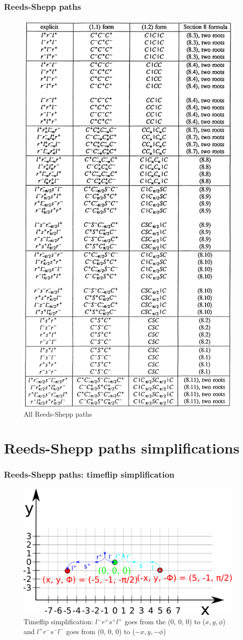 \documentclass{beamer}
\begin{document}
\begin{frame}

\frametitle{Reeds-Shepp paths}

\begin{figure}
\centering
  \centering
  \includegraphics[width=0.4\linewidth]{Illustrations/ReedsSheppPossibilitiesNoTitle.png}
  \caption{All Reeds-Shepp paths}
  \label{fig:sub1}
\end{figure}
\end{frame}

\section{Reeds-Shepp paths simplifications}

\begin{frame}

\frametitle{Reeds-Shepp paths: timeflip simplification}

\begin{figure}
\centering
  \centering
  \includegraphics[width=\linewidth]{Illustrations/timeflip.png}
  \caption{Timeflip simplification: $l^-r^+s^+l^+$ goes from the (0, 0, 0) to ($x, y, \phi$) and $l^+r^-s^-l^-$ goes from (0, 0, 0) to ($-x,y,-\phi$)}
  \label{fig:sub1}
\end{figure}
\end{frame}
\end{document}
